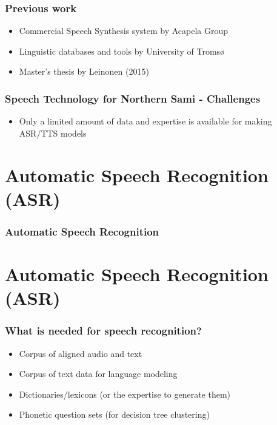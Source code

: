 \begin{frame}
\frametitle{Previous work}
\begin{itemize}
\item Commercial Speech Synthesis system by Acapela Group\\
\item Linguistic databases and tools by University of Tromsø\\[1cm]
\item Master's thesis by Leinonen (2015)\\
\end{itemize}
\end{frame}

\begin{frame}
\frametitle{Speech Technology for Northern Sami - Challenges}
\begin{itemize}
\item Only a limited amount of data and expertise is available for making ASR/TTS models
\end{itemize}
\end{frame}



\section[Speech Recognition]{Automatic Speech Recognition (ASR)}
\begin{frame}
\frametitle{Automatic Speech Recognition}


\end{frame}




\section[Speech Recognition]{Automatic Speech Recognition (ASR)}
\begin{frame}
\frametitle{What is needed for speech recognition?}
\begin{itemize}
\item Corpus of aligned audio and text
\item Corpus of text data for language modeling
\item Dictionaries/lexicons (or the expertise to generate them)
\item Phonetic question sets (for decision tree clustering)
\end{itemize}
\end{frame}



